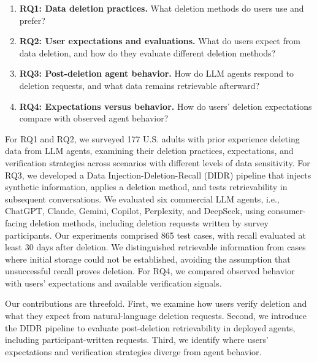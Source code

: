 \begin{enumerate}[leftmargin=4pt,itemindent=0pt,labelsep=0pt]
    \item[] \textbf{RQ1: Data deletion practices.}
    What deletion methods do users use and prefer?

    \item[] \textbf{RQ2: User expectations and evaluations.}
    What do users expect from data deletion, and how do they evaluate different deletion methods?

    \item[] \textbf{RQ3: Post-deletion agent behavior.}
    How do LLM agents respond to deletion requests, and what data remains retrievable afterward?

    \item[] \textbf{RQ4: Expectations versus behavior.}
    How do users' deletion expectations compare with observed agent behavior?
\end{enumerate}

For RQ1 and RQ2, we surveyed 177 U.S. adults with prior experience deleting data from LLM agents, examining their deletion practices, expectations, and verification strategies across scenarios with different levels of data sensitivity.
%
For RQ3, we developed a Data Injection-Deletion-Recall (DIDR) pipeline that injects synthetic information, applies a deletion method, and tests retrievability in subsequent conversations.
%
We evaluated six commercial LLM agents, i.e., ChatGPT, Claude, Gemini, Copilot, Perplexity, and DeepSeek, using consumer-facing deletion methods, including deletion requests written by survey participants.
%
Our experiments comprised 865 test cases, with recall evaluated at least 30 days after deletion.
%
We distinguished retrievable information from cases where initial storage could not be established, avoiding the assumption that unsuccessful recall proves deletion.
%
For RQ4, we compared observed behavior with users' expectations and available verification signals.

Our contributions are threefold.
%
First, we examine how users verify deletion and what they expect from natural-language deletion requests.
%
Second, we introduce the DIDR pipeline to evaluate post-deletion retrievability in deployed agents, including participant-written requests.
%
Third, we identify where users' expectations and verification strategies diverge from agent behavior.

